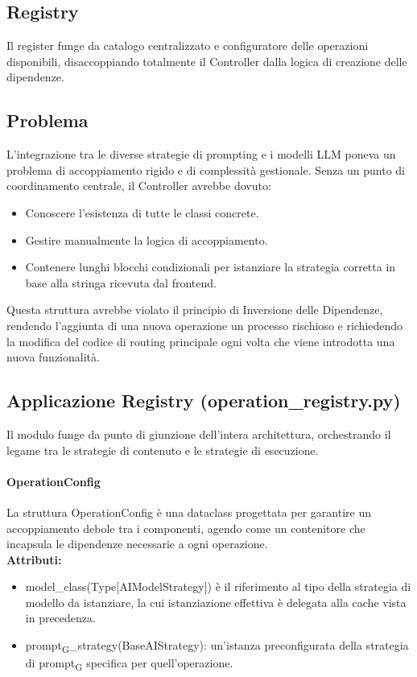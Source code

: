 \documentclass[11pt,a4paper]{article}
\newcommand{\gls}[1]{#1\textsubscript{G}}
\begin{document}
\subsection{Registry}
Il register funge da catalogo centralizzato e configuratore delle operazioni disponibili, disaccoppiando totalmente il Controller dalla logica di creazione delle dipendenze.

\subsection{Problema}
L’integrazione tra le diverse strategie di prompting e i modelli LLM poneva un problema di accoppiamento rigido e di complessità gestionale. Senza un punto di coordinamento centrale, il Controller avrebbe dovuto:
\begin{itemize}
    \item Conoscere l'esistenza di tutte le classi concrete.
    \item Gestire manualmente la logica di accoppiamento.
    \item Contenere lunghi blocchi condizionali per istanziare la strategia corretta in base alla stringa ricevuta dal frontend.
\end{itemize}
Questa struttura avrebbe violato il principio di Inversione delle Dipendenze, rendendo l'aggiunta di una nuova operazione un processo rischioso e richiedendo la modifica del codice di routing principale ogni volta che viene introdotta una nuova funzionalità.

\subsection{Applicazione Registry (operation\_registry.py)}
Il modulo funge da punto di giunzione dell'intera architettura, orchestrando il legame tra le strategie di contenuto e le strategie di esecuzione.
\paragraph{OperationConfig} La struttura OperationConfig è una dataclass progettata per garantire un accoppiamento debole tra i componenti, agendo come un contenitore che incapsula le dipendenze necessarie a ogni operazione.
\\ \textbf{Attributi:}
\begin{itemize}
    \item model\_class(Type[AIModelStrategy]) è il riferimento al tipo della strategia di modello da istanziare, la cui istanziazione effettiva è delegata alla cache vista in precedenza.
    \item \gls{prompt}\_strategy(BaseAIStrategy): un'istanza preconfigurata della strategia di \gls{prompt} specifica per quell'operazione.
\end{itemize}
\end{document}
